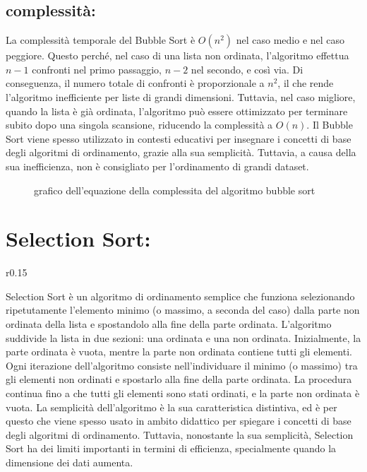 \documentclass{article}
\begin{document}
\subsection{complessità:}
La complessità temporale del Bubble Sort è \(O(n^2)\) nel caso medio e nel caso peggiore. Questo perché, nel caso di una lista non ordinata, l'algoritmo 
effettua \(n-1\) confronti nel primo passaggio, \(n-2\) nel secondo, e così via. Di conseguenza, il numero totale di confronti è proporzionale a \(n^2\), il che 
rende l'algoritmo inefficiente per liste di grandi dimensioni. Tuttavia, nel caso migliore, quando la lista è già ordinata, l'algoritmo può essere ottimizzato
per terminare subito dopo una singola scansione, riducendo la complessità a \(O(n)\).
Il Bubble Sort viene spesso utilizzato in contesti educativi per insegnare i concetti di base degli algoritmi di ordinamento, grazie alla sua semplicità. Tuttavia, 
a causa della sua inefficienza, non è consigliato per l'ordinamento di grandi dataset.
\begin{figure}[h]
    \caption{grafico dell'equazione della complessita del algoritmo bubble sort}
\end{figure}
\section{Selection Sort:}
\begin{wrapfigure}{r}{0.15\textwidth}
    \begin{center}
    \end{center}
\end{wrapfigure}
Selection Sort è un algoritmo di ordinamento semplice che funziona selezionando ripetutamente l'elemento minimo (o massimo, a seconda del caso) dalla
 parte non ordinata della lista e spostandolo alla fine della parte ordinata. L'algoritmo suddivide la lista in due sezioni: una ordinata e una non ordinata. 
 Inizialmente, la parte ordinata è vuota, mentre la parte non ordinata contiene tutti gli elementi. Ogni iterazione dell'algoritmo consiste nell'individuare 
 il minimo (o massimo) tra gli elementi non ordinati e spostarlo alla fine della parte ordinata. La procedura continua fino a che tutti gli elementi sono stati 
 ordinati, e la parte non ordinata è vuota.
La semplicità dell'algoritmo è la sua caratteristica distintiva, ed è per questo che viene spesso usato in ambito didattico per spiegare i concetti di base 
degli algoritmi di ordinamento. Tuttavia, nonostante la sua semplicità, Selection Sort ha dei limiti importanti in termini di efficienza, specialmente
quando la dimensione dei dati aumenta.
\end{document}
